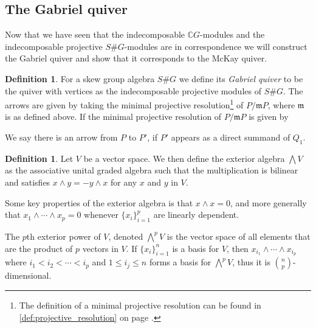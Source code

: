 \documentclass[11pt, a4paper, english]{article}
\theoremstyle{definition}
\newtheorem{defin}[theorem]{Definition}
\newcommand{\C}{\mathbb{C}}
\begin{document}
\subsection{The Gabriel quiver}
Now that we have seen that the indecomposable $\C G$-modules and the indecomposable projective $S\#G$-modules are in correspondence we will construct the Gabriel quiver and show that it corresponds to the McKay quiver.

\begin{defin}
\label{def:gabriel_quiver}
For a skew group algebra $S\#G$ we define its \textit{Gabriel quiver} to be the quiver with vertices as the indecomposable projective modules of $S\#G$. The arrows are given by taking the minimal projective resolution\footnote{The definition of a minimal projective resolution can be found in \cref{def:projective_resolution} on page \pageref{def:projective_resolution}.} of $P/\mathfrak{m}P$, where $\mathfrak{m}$ is as defined above. If the minimal projective resolution of $P/\mathfrak{m}P$ is given by
\begin{center}
\end{center}
We say there is an arrow from $P$ to $P'$, if $P'$ appears as a direct summand of $Q_1$.
\end{defin}

\begin{defin}
Let $V$ be a vector space. We then define the exterior algebra $\bigwedge V$ as the associative unital graded algebra such that the multiplication is bilinear and satisfies $x \wedge y = -y \wedge x$ for any $x$ and $y$ in $V$.
\end{defin}
Some key properties of the exterior algebra is that $x \wedge x = 0$, and more generally that $x_1 \wedge \cdots \wedge x_p = 0$ whenever $\{x_i\}_{i=1}^p$ are linearly dependent.

The $p$th exterior power of $V$, denoted $\bigwedge\limits^p V$ is the vector space of all elements that are the product of $p$ vectors in $V$. If $\{ x_i \}_{i=1}^n$ is a basis for $V$, then $x_{i_1} \wedge \cdots \wedge x_{i_p}$ where $i_1 < i_2 < \cdots < i_p$ and $1 \leq i_j \leq n$ forms a basis for $\bigwedge\limits^p V$, thus it is ${n \choose p}$-dimensional. 
\end{document}
